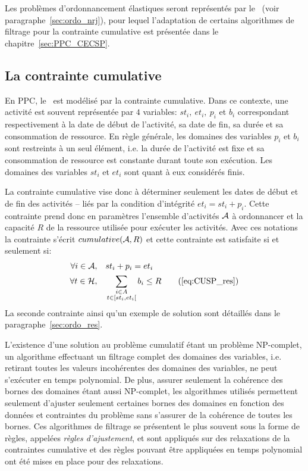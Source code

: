 Les problèmes d'ordonnancement élastiques seront représentés par le
\CECSP~(voir paragraphe~\ref{sec:ordo_nrj}), pour lequel l'adaptation
de certains algorithmes de filtrage pour la contrainte cumulative est
présentée dans le chapitre~\ref{sec:PPC_CECSP}.

\subsection{La contrainte cumulative}
\label{sec:cumu_cume}

En PPC, le \CUSP~est modélisé par la contrainte cumulative. Dans ce
contexte, une activité est souvent représentée par $4$ variables:
$st_i,\ et_i,\ p_i$ et $b_i$ correspondant respectivement à la date de
début de l'activité, sa date de fin, sa durée et sa consommation de
ressource. En règle générale, les domaines des variables $p_i$ et
$b_i$ sont restreints à un seul élément, i.e. la durée de l'activité
est fixe et sa consommation de ressource est constante durant toute
son exécution. Les domaines des variables $st_i$ et $et_i$ sont quant
à eux considérés finis.

La contrainte cumulative vise donc à déterminer seulement les dates de
début et de fin des activités -- liés par la condition d'intégrité
$et_i=st_i+p_i$. Cette contrainte prend donc en paramètres l'ensemble
d'activités ${\cal A}$ à ordonnancer et la capacité $R$ de la ressource utilisée
pour exécuter les activités. Avec ces notations la contrainte s'écrit
$cumulative({\cal A},R)$ et cette contrainte est satisfaite si et seulement 
si:
\begin{align}
  \forall i \in \A, & \quad  st_i+p_i=et_i \label{eq:CUSP_int}\\
  \forall t \in \H, &\quad \sum_{\substack{i \in A\\t \in
  [st_i,et_i[}} b_i \le R  \tag{\ref{eq:CUSP_res}} 
\end{align}
La seconde contrainte ainsi qu'un exemple de solution sont détaillés
dans le paragraphe~\ref{sec:ordo_res}.

L'existence d'une solution au problème cumulatif étant un problème
NP-complet, un algorithme effectuant un filtrage complet des domaines
des variables, i.e. retirant toutes les valeurs incohérentes des
domaines des variables, ne peut s'exécuter en temps polynomial. De
plus, assurer seulement la cohérence des bornes des domaines étant
aussi NP-complet, les algorithmes utilisés permettent seulement
d'ajuster seulement certaines bornes des domaines en fonction des
données et contraintes du problème sans s'assurer de la cohérence de
toutes les bornes. Ces algorithmes de filtrage se présentent le plus
souvent sous la forme de règles, appelées {\it règles d'ajustement},
et sont appliqués sur des relaxations de la contraintes cumulative et
des règles pouvant être appliquées en temps polynomial ont été mises
en place pour des relaxations.

